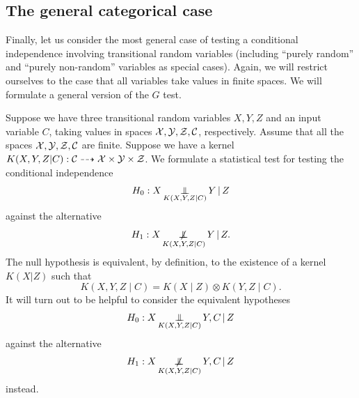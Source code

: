 


\subsection{The general categorical case}

Finally, let us consider the most general case of testing a conditional independence involving transitional
random variables (including ``purely random'' and ``purely non-random'' variables as special cases).
Again, we will restrict ourselves to the case that all variables take values in finite spaces.
We will formulate a general version of the $G$ test.


Suppose we have three transitional random variables $X,Y,Z$ and an input variable $C$,
taking values in spaces $\mathcal{X}, \mathcal{Y}, \mathcal{Z}, \mathcal{C}$, respectively. 
Assume that all the spaces $\mathcal{X},\mathcal{Y},\mathcal{Z},\mathcal{C}$ are finite.
Suppose we have a kernel $K(X,Y,Z|C) : \mathcal{C} \dashrightarrow \mathcal{X} \times \mathcal{Y} \times \mathcal{Z}$.
We formulate a statistical test for testing the conditional independence
$$H_0 : X \operatorname*{\perp\mkern-11mu\perp}_{K(X,Y,Z|C)} Y \operatorname*{|} Z$$
against the alternative
$$H_1 : X \operatorname*{\not\mkern-2mu\perp\mkern-11mu\perp}_{K(X,Y,Z|C)} Y \operatorname*{|} Z.$$
The null hypothesis is equivalent, by definition, to the existence of a kernel $K(X|Z)$ such that
$$K(X,Y,Z \mid C) = K(X \mid Z) \otimes K(Y,Z \mid C).$$
It will turn out to be helpful to consider the equivalent hypotheses
$$H_0 : X \operatorname*{\perp\mkern-11mu\perp}_{K(X,Y,Z|C)} Y,C \operatorname*{|} Z$$
against the alternative
$$H_1 : X \operatorname*{\not\mkern-2mu\perp\mkern-11mu\perp}_{K(X,Y,Z|C)} Y,C \operatorname*{|} Z$$
instead.

